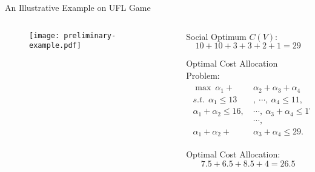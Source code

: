 \documentclass[14pt]{beamer}
\begin{document}
\begin{frame}{An Illustrative Example on UFL Game}
\small
\begin{columns}
\begin{column}{5.5cm}
\vspace{-10mm}
\begin{figure}[H]
\centering
\texttt{[image: preliminary-example.pdf]}
\end{figure}
\end{column}
\begin{column}{5.5cm}
\vspace{-5mm}
\footnotesize
\begin{shaded}
Social Optimum $C(V)$:
\begin{equation*}
10+10+3+3+2+1=29
\end{equation*}
\vspace{-5mm}
\end{shaded}
\vspace{-10mm}
\begin{shaded}
Optimal Cost Allocation Problem:
\begin{eqnarray*}
\begin{aligned}
\max ~\alpha_1 + &\alpha_2 + \alpha_3 + \alpha_4\\
s.t.~~ \alpha_1 \leq 13&,~\cdots,~\alpha_4 \leq 11,\\
\alpha_1 + \alpha_2 \leq 16,~&\cdots,~ \alpha_3+\alpha_4 \leq 17,\\
~~~~~~~~~~~~~~~&\cdots,\\
\alpha_1 + \alpha_2 + &\alpha_3 + \alpha_4 \leq 29.
\end{aligned}
\end{eqnarray*}
\vspace{-5mm}
\end{shaded}
\vspace{-10mm}
\begin{shaded}
Optimal Cost Allocation:
\begin{equation*}
7.5+6.5+8.5+4=26.5
\end{equation*}
\vspace{-5mm}
\end{shaded}
\end{column}
\end{columns}
\end{frame}
\end{document}
